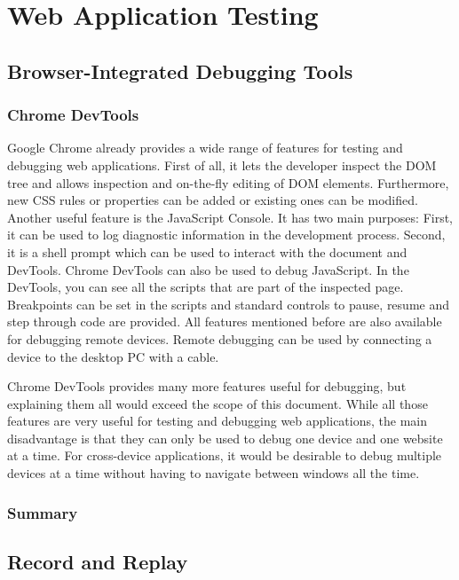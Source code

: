 \section{Web Application Testing}

\subsection{Browser-Integrated Debugging Tools}

\subsubsection{Chrome DevTools}

Google Chrome already provides a wide range of features for testing and debugging web applications. First of all, it lets the developer inspect the DOM tree  and allows inspection and on-the-fly editing of DOM elements. Furthermore, new CSS rules or properties can be added or existing ones can be modified. Another useful feature is the JavaScript Console. It has two main purposes: First, it can be used to log diagnostic information in the development process. Second, it is a shell prompt which can be used to interact with the document and DevTools. Chrome DevTools can also be used to debug JavaScript. In the DevTools, you can see all the scripts that are part of the inspected page. Breakpoints can be set in the scripts and standard controls to pause, resume and step through code are provided. All features mentioned before are also available for debugging remote devices. Remote debugging can be used by connecting a device to the desktop PC with a cable.

Chrome DevTools provides many more features useful for debugging, but explaining them all would exceed the scope of this document. While all those features are very useful for testing and debugging web applications, the main disadvantage is that they can only be used to debug one device and one website at a time. For cross-device applications, it would be desirable to debug multiple devices at a time without having to navigate between windows all the time.

\subsubsection{Summary}

\subsection{Record and Replay}

